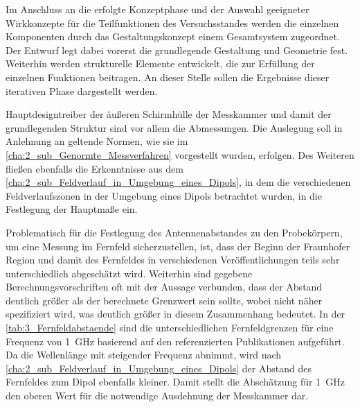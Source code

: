 

Im Anschluss an die erfolgte Konzeptphase und der Auswahl geeigneter Wirkkonzepte für die Teilfunktionen des Versuchsstandes werden die einzelnen Komponenten durch das Gestaltungskonzept einem Gesamtsystem zugeordnet. Der Entwurf legt dabei vorerst die grundlegende Gestaltung und Geometrie fest. Weiterhin werden strukturelle Elemente entwickelt, die zur Erfüllung der einzelnen Funktionen beitragen. An dieser Stelle sollen die Ergebnisse dieser iterativen Phase dargestellt werden.
\par
\vspace{\linespace}
Hauptdesigntreiber der äußeren Schirmhülle der Messkammer und damit der grundlegenden Struktur sind vor allem die Abmessungen. Die Auslegung soll in Anlehnung an geltende Normen, wie sie im \Abschnitt\ref{cha:2_sub_Genormte_Messverfahren} vorgestellt wurden, erfolgen. Des Weiteren fließen ebenfalls die Erkenntnisse aus dem \Abschnitt\ref{cha:2_sub_Feldverlauf_in_Umgebung_eines_Dipols}, in dem die verschiedenen Feldverlaufszonen in der Umgebung eines Dipols betrachtet wurden, in die Festlegung der Hauptmaße ein.
\par
\vspace{\linespace}
Problematisch für die Festlegung des Antennenabstandes zu den Probekörpern, um eine Messung im Fernfeld sicherzustellen, ist, dass der Beginn der Fraunhofer Region und damit des Fernfeldes in verschiedenen Veröffentlichungen teils sehr unterschiedlich abgeschätzt wird. Weiterhin sind gegebene Berechnungsvorschriften oft mit der Aussage verbunden, dass der Abstand deutlich größer als der berechnete Grenzwert sein sollte, wobei nicht näher spezifiziert wird, was deutlich größer in diesem Zusammenhang bedeutet. In der \Tabelle\ref{tab:3_Fernfeldabstaende} sind die unterschiedlichen Fernfeldgrenzen für eine Frequenz von \SI{1}{\giga\hertz} basierend auf den referenzierten Publikationen aufgeführt. Da die Wellenlänge mit steigender Frequenz abnimmt, wird nach \Abschnitt\ref{cha:2_sub_Feldverlauf_in_Umgebung_eines_Dipols} der Abstand des Fernfeldes zum Dipol ebenfalls kleiner. Damit stellt die Abschätzung für \SI{1}{\giga\hertz} den oberen Wert für die notwendige Ausdehnung der Messkammer dar.


